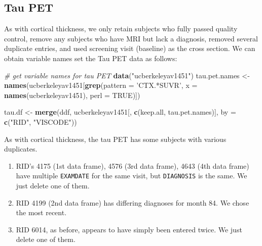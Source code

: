 \documentclass[
]{article}
\newenvironment{Shaded}{\begin{snugshade}}{\end{snugshade}}
\newcommand{\CommentTok}[1]{\textcolor[rgb]{0.56,0.35,0.01}{\textit{#1}}}
\newcommand{\DataTypeTok}[1]{\textcolor[rgb]{0.13,0.29,0.53}{#1}}
\newcommand{\KeywordTok}[1]{\textcolor[rgb]{0.13,0.29,0.53}{\textbf{#1}}}
\newcommand{\NormalTok}[1]{#1}
\newcommand{\OtherTok}[1]{\textcolor[rgb]{0.56,0.35,0.01}{#1}}
\newcommand{\StringTok}[1]{\textcolor[rgb]{0.31,0.60,0.02}{#1}}
\begin{document}
\hypertarget{tau-pet}{%
\subsection{Tau PET}\label{tau-pet}}

As with cortical thickness, we only retain subjects who fully passed
quality control, remove any subjects who have MRI but lack a diagnosis,
removed several duplicate entries, and used screening visit (baseline)
as the cross section. We can obtain variable names set the Tau PET data
as follows:

\begin{Shaded}
\begin{Highlighting}[]
\CommentTok{# get variable names for tau PET}
\KeywordTok{data}\NormalTok{(}\StringTok{"ucberkeleyav1451"}\NormalTok{)}
\NormalTok{tau.pet.names <-}\StringTok{ }\KeywordTok{names}\NormalTok{(ucberkeleyav1451[}\KeywordTok{grep}\NormalTok{(}\DataTypeTok{pattern =} \StringTok{'CTX.*SUVR'}\NormalTok{, }
                                             \DataTypeTok{x =} \KeywordTok{names}\NormalTok{(ucberkeleyav1451),}
                                             \DataTypeTok{perl =} \OtherTok{TRUE}\NormalTok{)])}

\NormalTok{tau.df <-}\StringTok{ }\KeywordTok{merge}\NormalTok{(ddf, ucberkeleyav1451[, }\KeywordTok{c}\NormalTok{(keep.all, tau.pet.names)], }
                \DataTypeTok{by =} \KeywordTok{c}\NormalTok{(}\StringTok{"RID"}\NormalTok{, }\StringTok{"VISCODE"}\NormalTok{))}
\end{Highlighting}
\end{Shaded}

As with cortical thickness, the tau PET has some subjects with various
duplicates.

\begin{enumerate}
\def\labelenumi{(\arabic{enumi})}
\item
  RID's 4175 (1st data frame), 4576 (3rd data frame), 4643 (4th data
  frame) have multiple \texttt{EXAMDATE} for the same visit, but
  \texttt{DIAGNOSIS} is the same. We just delete one of them.
\item
  RID 4199 (2nd data frame) has differing diagnoses for month 84. We
  chose the most recent.
\item
  RID 6014, as before, appears to have simply been entered twice. We
  just delete one of them.
\end{enumerate}
\end{document}
